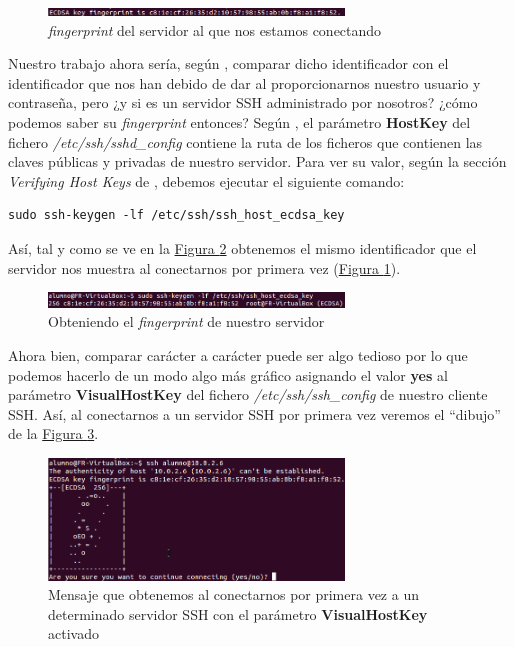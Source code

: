 \documentclass[10pt,a4paper,spanish]{article}
\begin{document}
\begin{figure}[!h]
    \centering
    \includegraphics[width=0.7\textwidth]{fingerprint}
    \caption{\textit{fingerprint} del servidor al que nos estamos conectando}
    \label{fingerprint}
\end{figure}

Nuestro trabajo ahora sería, según \cite{valenciano}, comparar dicho identificador con el identificador que nos han debido de dar al proporcionarnos nuestro usuario y contraseña, pero ¿y si es un servidor SSH administrado por nosotros? ¿cómo podemos saber su \textit{fingerprint} entonces? Según \cite{sshd}, el parámetro \textbf{HostKey} del fichero \textit{/etc/ssh/sshd\_config} contiene la ruta de los ficheros que contienen las claves públicas y privadas de nuestro servidor. Para ver su valor, según la sección \textit{Verifying Host Keys} de \cite{manssh}, debemos ejecutar el siguiente comando:

\begin{verbatim}
sudo ssh-keygen -lf /etc/ssh/ssh_host_ecdsa_key
\end{verbatim}

Así, tal y como se ve en la \hyperref[clave]{Figura \ref*{clave}} obtenemos el mismo identificador que el servidor nos muestra al conectarnos por primera vez (\hyperref[fingerprint]{Figura \ref*{fingerprint}}).

\begin{figure}[!h]
    \centering
    \includegraphics[width=0.7\textwidth]{clave}
    \caption{Obteniendo el \textit{fingerprint} de nuestro servidor}
    \label{clave}
\end{figure}

Ahora bien, comparar carácter a carácter puede ser algo tedioso por lo que podemos hacerlo de un modo algo más gráfico asignando el valor \textbf{yes} al parámetro \textbf{VisualHostKey} del fichero \textit{/etc/ssh/ssh\_config} de nuestro cliente SSH. Así, al conectarnos a un servidor SSH por primera vez veremos el ``dibujo'' de la \hyperref[visualhostkey]{Figura \ref*{visualhostkey}}.

\begin{figure}[!h]
    \centering
    \includegraphics[width=0.7\textwidth]{visualhostkey}
    \caption{Mensaje que obtenemos al conectarnos por primera vez a un determinado servidor SSH con el parámetro \textbf{VisualHostKey} activado}
    \label{visualhostkey}
\end{figure}
\end{document}
